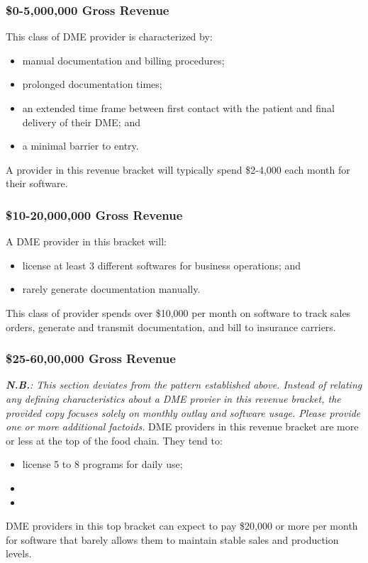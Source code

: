 \documentclass[letterpaper]{article}
\begin{document}
  \subsubsection{\$0-5,000,000 Gross Revenue}
  This class of DME provider is characterized by:%
  \begin{itemize}
    \item manual documentation and billing procedures;
    \item prolonged documentation times;
    \item an extended time frame between first contact with the patient and final delivery of their DME; and
    \item a minimal barrier to entry.
  \end{itemize}
  A provider in this revenue bracket will typically spend \$2-4,000 each month for their software.%

  \subsubsection{\$10-20,000,000 Gross Revenue}
  A DME provider in this bracket will:%
  \begin{itemize}
    \item license at least 3 different softwares for business operations; and
    \item rarely generate documentation manually.
  \end{itemize}
  This class of provider spends over \$10,000 per month on software to track sales orders, generate and transmit documentation, and bill to insurance carriers.%

  \subsubsection{\$25-60,00,000 Gross Revenue}
  \textit{\textbf{N.B.}: This section deviates from the pattern established above. Instead of relating any defining characteristics about a DME provier in this revenue bracket, the provided copy focuses solely on monthly outlay and software usage. Please provide one or more additional factoids.}
  DME providers in this revenue bracket are more or less at the top of the food chain. They tend to:%
  \begin{itemize}
    \item license 5 to 8 programs for daily use;
    \item
    \item
  \end{itemize}
  DME providers in this top bracket can expect to pay \$20,000 or more per month for software that barely allows them to maintain stable sales and production levels.%
\end{document}

